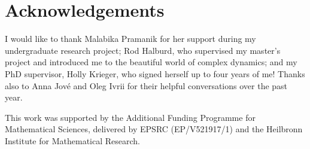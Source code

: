 \documentclass[11pt,reqno]{amsart}
\newcommand{\0}{\mathbf{0}}
\theoremstyle{remark}
\numberwithin{equation}{section}
\theoremstyle{remark}
\numberwithin{equation}{section}
\begin{document}
\section*{Acknowledgements}
\thispagestyle{empty}
I would like to thank Malabika Pramanik for her support during my undergraduate research project; Rod Halburd, who supervised my master’s project and introduced me to the beautiful world of complex dynamics; and my PhD supervisor, Holly Krieger, who signed herself up to four years of me! Thanks also to Anna Jové and Oleg Ivrii for their helpful conversations over the past year.

This work was supported by the Additional Funding Programme for Mathematical Sciences, delivered by EPSRC (EP/V521917/1) and the Heilbronn Institute for Mathematical Research.

\clearpage

\newpage

%
%
\end{document}
